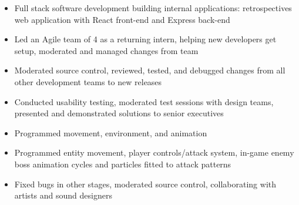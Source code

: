 \documentclass[10pt,a4paper,ragged2e,withhyper]{altacv}
\begin{document}
\begin{itemize}
    \item Full stack software development building internal applications: retrospectives web application with React front-end and Express back-end

    \item Led an Agile team of 4 as a returning intern, helping new developers get setup, moderated and managed changes from team

    \item Moderated source control, reviewed, tested, and debugged changes from all other development teams to new releases

    \item Conducted usability testing, moderated test sessions with design teams, presented and demonstrated solutions to senior executives
\end{itemize}

\divider




\begin{itemize}

\item Programmed movement, environment, and animation

\end{itemize}

\divider

\begin{itemize}

\item Programmed entity movement, player controls/attack system, in-game enemy boss animation cycles and particles fitted to attack patterns

\item Fixed bugs in other stages, moderated source control, collaborating with artists and sound designers

\end{itemize}
\end{document}
